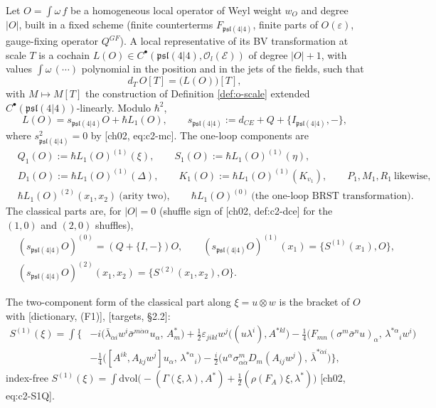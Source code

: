 \begin{definition}
\label{def:o-comp}
Let $O=\int\omega\,f$ be a homogeneous local operator of Weyl weight $w_O$ and degree $|O|$, built in a fixed scheme (finite counterterms $F_{\mathfrak{psl}(4|4)}$, finite parts of $O(\varepsilon)$, gauge-fixing operator $Q^{GF}$). A local representative of its BV transformation at scale $T$ is a cochain $L(O)\in C^\bullet(\mathfrak{psl}(4|4),\mathscr O_l(\mathscr E))$ of degree $|O|+1$, with values $\int\omega\,(\cdots)$ polynomial in the position and in the jets of the fields, such that
\begin{equation}
d_T\,O[T]=\big(L(O)\big)[T],
\label{eq:o-rep}
\end{equation}
with $M\mapsto M[T]$ the construction of Definition \ref{def:o-scale} extended $C^\bullet(\mathfrak{psl}(4|4))$-linearly. Modulo $\hbar^2$,
\begin{equation}
L(O)=s_{\mathfrak{psl}(4|4)}O+\hbar L_1(O),\qquad s_{\mathfrak{psl}(4|4)}:=d_{CE}+Q+\{I_{\mathfrak{psl}(4|4)},-\},
\label{eq:o-L1}
\end{equation}
where $s_{\mathfrak{psl}(4|4)}^2=0$ by [ch02, eq:c2-mc]. The one-loop components are
\[
\begin{aligned}
&Q_1(O):=\hbar L_1(O)^{(1)}(\xi),\qquad S_1(O):=\hbar L_1(O)^{(1)}(\eta),\\
&D_1(O):=\hbar L_1(O)^{(1)}(\Delta),\qquad K_1(O):=\hbar L_1(O)^{(1)}(K_{v_1}),\qquad P_1,M_1,R_1\ \text{likewise},\\
&\hbar L_1(O)^{(2)}(x_1,x_2)\ \text{(arity two)},\qquad \hbar L_1(O)^{(0)}\ \text{(the one-loop BRST transformation)}.
\end{aligned}
\]
The classical parts are, for $|O|=0$ (shuffle sign of [ch02, def:c2-dce] for the $(1,0)$ and $(2,0)$ shuffles),
\[
\begin{aligned}
&(s_{\mathfrak{psl}(4|4)}O)^{(0)}=(Q+\{I,-\})O,\qquad (s_{\mathfrak{psl}(4|4)}O)^{(1)}(x_1)=\{S^{(1)}(x_1),O\},\\
&(s_{\mathfrak{psl}(4|4)}O)^{(2)}(x_1,x_2)=\{S^{(2)}(x_1,x_2),O\}.
\end{aligned}
\]
\end{definition}

The two-component form of the classical part along $\xi=u\otimes w$ is the bracket of $O$ with [dictionary, (F1)], [targets, §2.2]:
\begin{equation}
\begin{aligned}
S^{(1)}(\xi)=\int\Big\{&-i\big(\bar\lambda_{\dot\alpha i}w^i\bar\sigma^{m\dot\alpha\alpha}u_\alpha,\,A^*_m\big)+\tfrac12\varepsilon_{jikl}w^j\big((u\lambda^i),A^{*kl}\big)-\tfrac14\big(F_{mn}(\sigma^m\bar\sigma^nu)_\alpha,\,\lambda^{*\alpha}{}_iw^i\big)\\
&-\tfrac14\big([A^{ik},A_{kj}w^j]u_\alpha,\,\lambda^{*\alpha}{}_i\big)-\tfrac i2\big(u^\alpha\sigma^m_{\alpha\dot\alpha}D_m(A_{ij}w^j),\,\bar\lambda^{*\dot\alpha i}\big)\Big\},
\end{aligned}
\label{eq:o-S1xi}
\end{equation}
index-free $S^{(1)}(\xi)=\int\mathrm{dvol}\big(-(\Gamma(\xi,\lambda),A^*)+\tfrac12(\rho(F_A)\xi,\lambda^*)\big)$ [ch02, eq:c2-S1Q].

